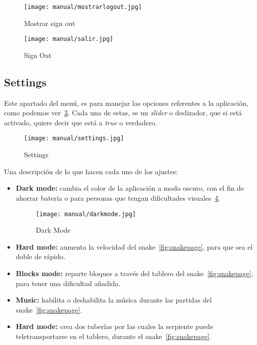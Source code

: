 \begin{figure}[H]
	\centering
	\texttt{[image: manual/mostrarlogout.jpg]}
	\caption{Mostrar sign out}\label{fig:mostrarlogout}
\end{figure}

\begin{figure}[H]
	\centering
	\texttt{[image: manual/salir.jpg]}
	\caption{Sign Out}\label{fig:salir}
\end{figure}

\subsection{Settings}\label{settings}
Este apartado del menú, es para manejar las opciones referentes a la aplicación, como podemos ver~\ref{fig:settingspage}. Cada una de estas, es un \emph{slider} o deslizador, que si está activado, quiere decir que está a \emph{true} o verdadero.

\begin{figure}[H]
	\centering
	\texttt{[image: manual/settings.jpg]}
	\caption{Settings}\label{fig:settingspage}
\end{figure}

Una descripción de lo que hacen cada uno de los ajustes:

\begin{itemize}
	\item \textbf{Dark mode:} cambia el color de la aplicación a modo oscuro, con el fin de ahorrar batería o para personas que tengan dificultades visuales~\ref{fig:darkmode}.
	\begin{figure}[H]
		\centering
		\texttt{[image: manual/darkmode.jpg]}
		\caption{Dark Mode}\label{fig:darkmode}
	\end{figure}
	\item \textbf{Hard mode:} aumenta la velocidad del snake~\ref{fig:snakepage}, para que sea el doble de rápido.
	\item \textbf{Blocks mode:} reparte bloques a través del tablero del snake~\ref{fig:snakepage}, para tener una dificultad añadida.
	\item \textbf{Music:} habilita o deshabilita la música durante las partidas del snake~\ref{fig:snakepage}.
	\item \textbf{Hard mode:} crea dos tuberías por las cuales la serpiente puede teletransportarse en el tablero, durante el  snake~\ref{fig:snakepage}.
\end{itemize}

